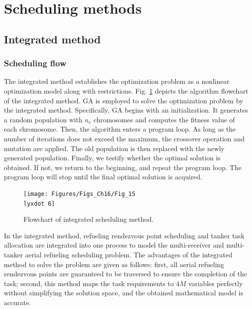 \section{Scheduling methods}\label{sec_4}
\subsection{ Integrated method}
\subsubsection{Scheduling flow}

The integrated method establishes the optimization problem as a nonlinear optimization model along with restrictions. Fig. \ref{Fig_15.6} depicts the algorithm flowchart of the integrated method. GA is employed to solve the optimization problem by the integrated method. Specifically, GA begins with an initialization. It generates a random population with $n_\text{c}$  chromosomes and computes the fitness value of each chromosome. Then, the algorithm enters a program loop. As long as the number of iterations does not exceed the maximum, the crossover operation and mutation are applied. The old population is then replaced with the newly generated population. Finally, we testify whether the optimal solution is obtained. If not, we return to the beginning, and repeat the program loop. The program loop will stop until the final optimal solution is acquired.

\begin{figure}
	\begin{centering}
		\texttt{[image: Figures/Figs\_Ch16/Fig\_15\\lyxdot 6]}
		\par\end{centering}
	\caption{Flowchart of integrated scheduling method.}
	\centering{}\label{Fig_15.6}
\end{figure}

In the integrated method, refueling rendezvous point scheduling and tanker task allocation are integrated into one process to model the multi-receiver and multi-tanker aerial refueling scheduling problem. The advantages of the integrated method to solve the problem are given as follows: first, all aerial refueling rendezvous points are guaranteed to be traversed to ensure the completion of the task; second, this method maps the task requirements to $4M$ variables perfectly without simplifying the solution space, and the obtained mathematical model is accurate.

